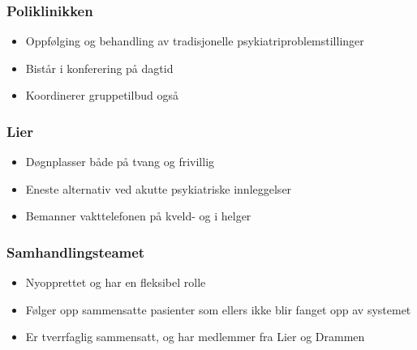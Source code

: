 \documentclass[11pt]{report} %
\begin{document}
                        \subsubsection{Poliklinikken}\label{sec:org_ddps_poli}
                          \begin{itemize}
                            \item Oppfølging og behandling av tradisjonelle psykiatriproblemstillinger\\
                            \item Bistår i konferering på dagtid\\
                            \item Koordinerer gruppetilbud også\\
                          \end{itemize}
                        \subsubsection{Lier}\label{sec:org_ddps_lier}
                          \begin{itemize}
                            \item Døgnplasser både på tvang og frivillig\\
                            \item Eneste alternativ ved akutte psykiatriske innleggelser\\
                            \item Bemanner vakttelefonen på kveld- og i helger\\
                          \end{itemize}  
                        \subsubsection{Samhandlingsteamet}\label{sec:org_ddps_samh}
                          \begin{itemize}
                            \item Nyopprettet og har en fleksibel rolle\\
                            \item Følger opp sammensatte pasienter som ellers ikke blir fanget opp av systemet\\
                            \item Er tverrfaglig sammensatt, og har medlemmer fra Lier og Drammen\\
                          \end{itemize}  
                        
\end{document}
